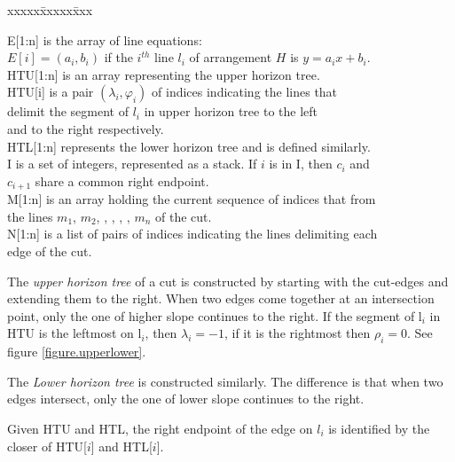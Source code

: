 \documentclass[12pt]{article}
\begin{document}
\begin{tabbing}

xxxxx\=xxxxx\=xxx\kill

\>         E[1:n] is the array of line equations:\\
\>\>                $E[i]=(a_{i}, b_{i})$ if the $i^{th}$ line $l_{i}$
 of arrangement $H$ is $y=a_{i}x+b_{i}$. \\
\>         HTU[1:n] is an array representing the upper horizon tree. \\
\>\>                HTU[i] is a pair $(\lambda_{i}, \varphi_{i})$ of indices
 indicating the lines that \\
\>\>                delimit the segment of $l_{i}$ in
upper horizon tree to the left\\
\>\>                and to the right respectively. \\
\>         HTL[1:n] represents the lower horizon tree and is defined
similarly. \\
\>           I  is a set of integers, represented as a stack. If $i$ is
in I, then $c_{i}$ and \\
\>\>                $c_{i+1}$ share a common right endpoint. \\
\>         M[1:n] is an array holding the current sequence of indices that from\\
\>\>                the lines $m_{1}$, $m_{2}$,  ,  ,  ,  ,
$m_{n}$ of the cut.\\
\>         N[1:n] is a list of pairs of indices indicating the lines
 delimiting each \\
\>\>                edge of the cut. \\

\end{tabbing}

The {\em upper horizon tree} of a cut is constructed by starting with the
cut-edges and extending them to the right. When two edges come together
at an intersection point, only the one of higher slope continues to the
right. If the segment of l$_{i}$ in HTU is the leftmost on l$_{i}$,
then $\lambda_{i}= -1$, if it is the rightmost then $\rho_{i}=0$.  See figure \ref{figure.upperlower}.

The {\em Lower horizon tree} is constructed similarly.  The difference is
that when two edges intersect, only the one of lower slope continues
to the right.

Given HTU and HTL, the right endpoint of the edge on $l_{i}$ is
identified by the closer of HTU[$i$] and HTL[$i$].
\end{document}
